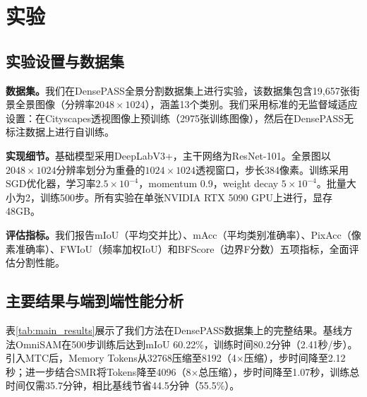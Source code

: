 \section{实验}
\label{sec:experiments}

\subsection{实验设置与数据集}

\textbf{数据集。}我们在DensePASS\cite{ma2021densepass}全景分割数据集上进行实验，该数据集包含19,657张街景全景图像（分辨率$2048 \times 1024$），涵盖13个类别。我们采用标准的无监督域适应设置：在Cityscapes\cite{cordts2016cityscapes}透视图像上预训练（2975张训练图像），然后在DensePASS无标注数据上进行自训练。

\textbf{实现细节。}基础模型采用DeepLabV3+\cite{chen2017deeplab}，主干网络为ResNet-101。全景图以$2048 \times 1024$分辨率划分为重叠的$1024 \times 1024$透视窗口，步长384像素。训练采用SGD优化器，学习率$2.5 \times 10^{-4}$，momentum 0.9，weight decay $5 \times 10^{-4}$。批量大小为2，训练500步。所有实验在单张NVIDIA RTX 5090 GPU上进行，显存48GB。

\textbf{评估指标。}我们报告mIoU（平均交并比）、mAcc（平均类别准确率）、PixAcc（像素准确率）、FWIoU（频率加权IoU）和BFScore（边界F分数）\cite{csurka2013good}五项指标，全面评估分割性能。

\subsection{主要结果与端到端性能分析}

表\ref{tab:main_results}展示了我们方法在DensePASS数据集上的完整结果。基线方法OmniSAM\cite{zhong2025omnisam}在500步训练后达到mIoU 60.22\%，训练时间80.2分钟（2.41秒/步）。引入MTC后，Memory Tokens从32768压缩至8192（4$\times$压缩），步时间降至2.12秒；进一步结合SMR将Tokens降至4096（8$\times$总压缩），步时间降至1.07秒，训练总时间仅需35.7分钟，相比基线节省44.5分钟（55.5\%）。

